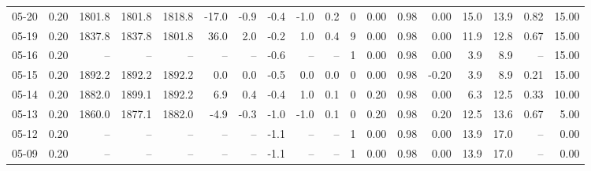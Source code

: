 \begin{threeparttable}
{\begin{tabular}{lrrrrrrrrrrrrrrrrr}
  05-20 &     0.20 & 1801.8 & 1801.8 & 1818.8 &      -17.0 &           -0.9 &                      -0.4 &                     -1.0 &                 0.2 &              0 &       0.00 &      0.98 &           0.00 &             15.0 &                13.9 &            0.82 &                  15.00 \\
  05-19 &     0.20 & 1837.8 & 1837.8 & 1801.8 &       36.0 &            2.0 &                      -0.2 &                      1.0 &                 0.4 &              9 &       0.00 &      0.98 &           0.00 &             11.9 &                12.8 &            0.67 &                  15.00 \\
  05-16 &     0.20 &     -- &     -- &     -- &         -- &             -- &                      -0.6 &                       -- &                  -- &              1 &       0.00 &      0.98 &           0.00 &              3.9 &                 8.9 &              -- &                  15.00 \\
  05-15 &     0.20 & 1892.2 & 1892.2 & 1892.2 &        0.0 &            0.0 &                      -0.5 &                      0.0 &                 0.0 &              0 &       0.00 &      0.98 &          -0.20 &              3.9 &                 8.9 &            0.21 &                  15.00 \\
  05-14 &     0.20 & 1882.0 & 1899.1 & 1892.2 &        6.9 &            0.4 &                      -0.4 &                      1.0 &                 0.1 &              0 &       0.20 &      0.98 &           0.00 &              6.3 &                12.5 &            0.33 &                  10.00 \\
  05-13 &     0.20 & 1860.0 & 1877.1 & 1882.0 &       -4.9 &           -0.3 &                      -1.0 &                     -1.0 &                 0.1 &              0 &       0.20 &      0.98 &           0.20 &             12.5 &                13.6 &            0.67 &                   5.00 \\
  05-12 &     0.20 &     -- &     -- &     -- &         -- &             -- &                      -1.1 &                       -- &                  -- &              1 &       0.00 &      0.98 &           0.00 &             13.9 &                17.0 &              -- &                   0.00 \\
  05-09 &     0.20 &     -- &     -- &     -- &         -- &             -- &                      -1.1 &                       -- &                  -- &              1 &       0.00 &      0.98 &           0.00 &             13.9 &                17.0 &              -- &                   0.00 \\

\end{tabular}}
\end{threeparttable}
